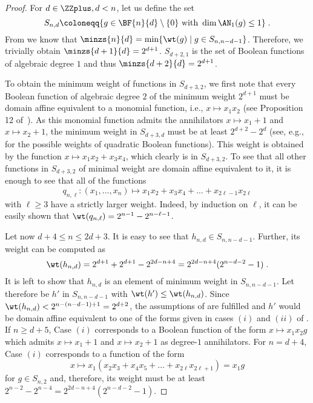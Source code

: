 \begin{proof}
For $d \in \ZZplus, d<n$, let us define the set \[S_{n,d} \coloneqq \{g \in \BF{n}{d}\setminus \{0\} \text{ with } \dim \AN_1(g) \leq 1 \}\;.\]
From  we know that $\minzs{n}{d} = \min \{\wt(g) \mid g \in S_{n,n-d-1} \}$. Therefore, we trivially obtain $\minzs{d+1}{d} = 2^{d+1}$. $S_{d+2,1}$ is the set of Boolean functions of algebraic degree $1$ and thus $\minzs{d+2}{d} = 2^{d+1}$.

To obtain the minimum weight of functions in $S_{d+3,2}$, we first note that every Boolean function of algebraic degree $2$ of the minimum weight $2^{d+1}$ must be domain affine equivalent to a monomial function, i.e., $x \mapsto x_1x_2$ (see Proposition 12 of~\cite{BMM:Carlet07}). As this monomial function admits the annihilators $x \mapsto x_1 +1$ and $x \mapsto x_2+1$, the minimum weight in $S_{d+3,d}$ must be at least $2^{d+2} - 2^{d}$ (see, e.g.,~\cite[p. 70]{BMM:Carlet07} for the possible weights of quadratic Boolean functions). This weight is obtained by the function $x \mapsto x_1x_2 + x_3x_4$, which clearly is in $S_{d+3,2}$. To see that all other functions in $S_{d+3,2}$ of minimal weight are domain affine equivalent to it, it is enough to see that all of the functions
$$
q_{n,\ell}\colon (x_1,\dots,x_n) \mapsto x_1x_2 + x_3x_4 + \dots + x_{2\ell-1}x_{2\ell}
$$
with $\ell \geq 3$ have a strictly larger weight. Indeed, by induction on $\ell$, it can be easily shown that $\wt(q_{n,\ell}) = 2^{n-1} - 2^{n-\ell-1}$.


Let now $d+4 \le n \le 2d+3$. It is easy to see that $h_{n,d} \in S_{n,n-d-1}$. Further, its weight can be computed as \[
\wt(h_{n,d}) =
2^{d+1} + 2^{d+1} - 2^{2d-n+4} = 
2^{2d-n+4}(2^{n-d-2}-1)\;.
\]
It is left to show that $h_{n,d}$ is an element of minimum weight in $S_{n,n-d-1}$. Let therefore be $h'$ in $S_{n,n-d-1}$ with $\wt(h') \leq \wt(h_{n,d})$. Since $\wt(h_{n,d}) < 2^{n-(n-d-1)+1}=2^{d+2}$, the assumptions of  are fulfilled and $h'$ would be domain affine equivalent to one of the forms given in cases $(i)$ and $(ii)$ of . If $n \geq d + 5$, Case $(i)$ corresponds to a Boolean function of the form $x \mapsto x_1x_2 g$ which admits $x \mapsto x_1+1$ and $x \mapsto x_2+1$ as degree-$1$ annihilators. For $n = d + 4$, Case $(i)$ corresponds to a function of the form
$$
x \mapsto x_1(x_2x_3 + x_4x_5 + \dots + x_{2\ell}x_{2\ell+1}) = x_1g
$$
for $g \in S_{n,2}$ and, therefore, its weight must be at least $2^{n-2}-2^{n-4} = 2^{2d-n+4}(2^{n-d-2}-1)$. 


\end{proof}

